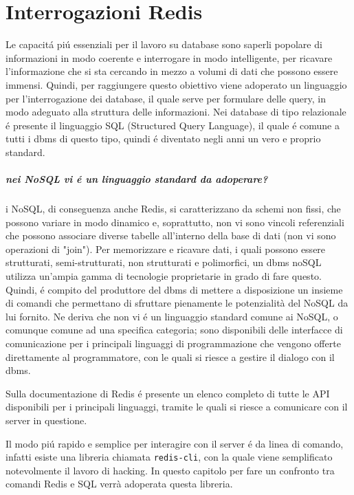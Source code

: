 \chapter{Interrogazioni Redis}
Le capacitá piú essenziali per il lavoro su database sono saperli popolare di informazioni in modo coerente e interrogare in modo
intelligente, per ricavare l'informazione che si sta cercando in mezzo a volumi di dati che possono essere immensi.
Quindi, per raggiungere questo obiettivo viene adoperato un linguaggio per l'interrogazione dei database, il quale serve per formulare delle
query, in modo adeguato alla struttura delle informazioni.
Nei database di tipo relazionale é presente il linguaggio SQL (Structured Query Language), il quale é comune a tutti i dbms di questo tipo, quindi
é diventato negli anni un vero e proprio standard.

\paragraph{nei NoSQL vi é un linguaggio standard da adoperare?\\}
i NoSQL, di conseguenza anche Redis, si caratterizzano da schemi non fissi, che possono variare in modo dinamico e, soprattutto, non vi sono vincoli referenziali che possono associare
diverse tabelle all'interno della base di dati (non vi sono operazioni di "join").
Per memorizzare e ricavare dati, i quali possono essere strutturati, semi-strutturati, non strutturati e polimorfici, un dbms noSQL utilizza un'ampia gamma di
tecnologie proprietarie in grado di fare questo.
Quindi, é compito del produttore del dbms di mettere a disposizione un insieme di comandi che permettano di sfruttare pienamente le potenzialità del NoSQL da lui fornito.
Ne deriva che non vi é un linguaggio standard comune ai NoSQL, o comunque comune ad una specifica categoria;
sono disponibili delle interfacce di comunicazione per i principali linguaggi di programmazione che vengono
offerte direttamente al programmatore, con le quali si riesce a gestire il dialogo con il dbms.

Sulla documentazione di Redis é presente un elenco completo di tutte le API disponibili per i principali linguaggi, tramite le quali si riesce a comunicare con il server in questione.

Il modo piú rapido e semplice per interagire con il server é da linea di comando, infatti esiste una libreria chiamata
\texttt{redis-cli}, con la quale viene semplificato notevolmente il lavoro di hacking.
In questo capitolo per fare un confronto tra comandi Redis e SQL verrà adoperata questa libreria.\\


